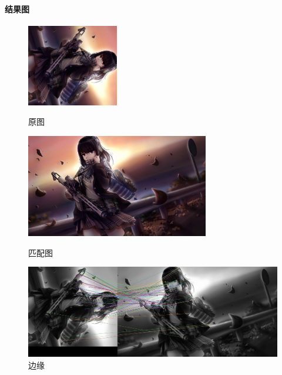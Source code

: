 \documentclass{article}
\begin{document}
        \paragraph{结果图}
        \begin{figure}[htbp]
                \begin{minipage}[t]{0.5\linewidth}\centering
                \includegraphics[width=4cm]{test1.png}
                \caption{原图}\label{1-a}
                \end{minipage}
                \begin{minipage}[t]{0.5\linewidth}\centering
                \includegraphics[width=8cm]{test2.png}
                \caption{匹配图}\label{1-b}
                \end{minipage}
                \begin{minipage}[t]{1\linewidth}\centering
                \includegraphics[width=12cm]{sift_matches.jpg}
                \caption{边缘}\label{1-c}
                \end{minipage}
            \end{figure}
\end{document}
